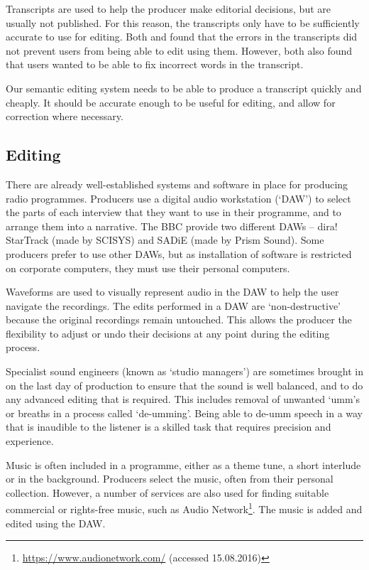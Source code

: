 Transcripts are used to help the producer make editorial decisions, but are
usually not published. For this reason, the transcripts only have to be
sufficiently accurate to use for editing. Both \citet{Whittaker2004} and
\citet{Sivaraman2016} found that the errors in the transcripts did not prevent users
from being able to edit using them. However, both also found that
users wanted to be able to fix incorrect words in the transcript.

Our semantic editing system needs to be able to produce a transcript quickly
and cheaply. It should be accurate enough to be useful for editing, and allow
for correction where necessary.

\subsection{Editing}
There are already well-established systems and software in place for producing
radio programmes. Producers use a digital audio workstation (`DAW') to select
the parts of each interview that they want to use in their programme, and to
arrange them into a narrative. The BBC provide two different DAWs -- dira!
StarTrack (made by SCISYS) and SADiE (made by Prism Sound). Some producers
prefer to use other DAWs, but as installation of software is restricted on
corporate computers, they must use their personal computers.

Waveforms are used to visually represent audio in the DAW to help the user
navigate the recordings. The edits performed in a DAW are `non-destructive'
because the original recordings remain untouched. This allows the producer the
flexibility to adjust or undo their decisions at any point during the editing
process.

Specialist sound engineers (known as `studio managers') are sometimes brought
in on the last day of production to ensure that the sound is well balanced, and
to do any advanced editing that is required. This includes removal of
unwanted `umm's or breaths in a process called `de-umming'. Being able to
de-umm speech in a way that is inaudible to the listener is a skilled task that
requires precision and experience.

Music is often included in a programme, either as a theme tune, a short
interlude or in the background. Producers select the music, often from their
personal collection. However, a number of services are also used for finding
suitable commercial or rights-free music, such as Audio
Network\footnote{\url{https://www.audionetwork.com/} (accessed 15.08.2016)}.
The music is added and edited using the DAW.

